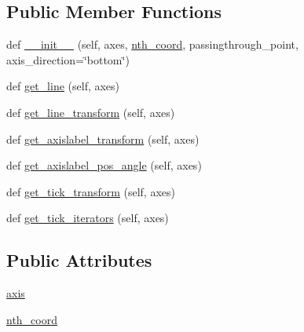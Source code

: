 \subsection*{Public Member Functions}
\begin{DoxyCompactItemize}
\item 
def \hyperlink{classaxisartist_1_1axislines_1_1AxisArtistHelperRectlinear_1_1Floating_ac92fe463a94c1623866adbabe9e56a56}{\+\_\+\+\_\+init\+\_\+\+\_\+} (self, axes, \hyperlink{classaxisartist_1_1axislines_1_1AxisArtistHelperRectlinear_1_1Floating_a04846c1f472b2f1b06741624411c4dbb}{nth\+\_\+coord}, passingthrough\+\_\+point, axis\+\_\+direction=\char`\"{}bottom\char`\"{})
\item 
def \hyperlink{classaxisartist_1_1axislines_1_1AxisArtistHelperRectlinear_1_1Floating_a28e3ecc4fef8c1191622ee7549c247b3}{get\+\_\+line} (self, axes)
\item 
def \hyperlink{classaxisartist_1_1axislines_1_1AxisArtistHelperRectlinear_1_1Floating_afa5a8e56076452e7899c96ff1b0f16e3}{get\+\_\+line\+\_\+transform} (self, axes)
\item 
def \hyperlink{classaxisartist_1_1axislines_1_1AxisArtistHelperRectlinear_1_1Floating_a91b87a76c78a3f8be960595c0b1cd4e5}{get\+\_\+axislabel\+\_\+transform} (self, axes)
\item 
def \hyperlink{classaxisartist_1_1axislines_1_1AxisArtistHelperRectlinear_1_1Floating_a3a45b0f1c7eff9a66043dec515b1c037}{get\+\_\+axislabel\+\_\+pos\+\_\+angle} (self, axes)
\item 
def \hyperlink{classaxisartist_1_1axislines_1_1AxisArtistHelperRectlinear_1_1Floating_ab71dee1c12bef5390d83e811cd36d141}{get\+\_\+tick\+\_\+transform} (self, axes)
\item 
def \hyperlink{classaxisartist_1_1axislines_1_1AxisArtistHelperRectlinear_1_1Floating_aaad0348539a20c8182f51c8eb973e44d}{get\+\_\+tick\+\_\+iterators} (self, axes)
\end{DoxyCompactItemize}
\subsection*{Public Attributes}
\begin{DoxyCompactItemize}
\item 
\hyperlink{classaxisartist_1_1axislines_1_1AxisArtistHelperRectlinear_1_1Floating_a4d236dc5d440adbdc5b78282346ab97b}{axis}
\item 
\hyperlink{classaxisartist_1_1axislines_1_1AxisArtistHelperRectlinear_1_1Floating_a04846c1f472b2f1b06741624411c4dbb}{nth\+\_\+coord}
\end{DoxyCompactItemize}


